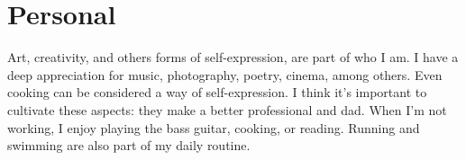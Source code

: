\documentclass[letterpaper]{article}
\begin{document}
\section*{Personal}

Art, creativity, and others forms of self-expression, are part of who I am. I have a deep appreciation for music, photography, poetry, cinema, among others. Even cooking can be considered a way of self-expression.  I think it's important to cultivate these aspects: they make a better professional and dad. When I'm not working, I enjoy playing the bass guitar, cooking, or reading. Running and swimming are also part of my daily routine.

\bigskip
\end{document}
